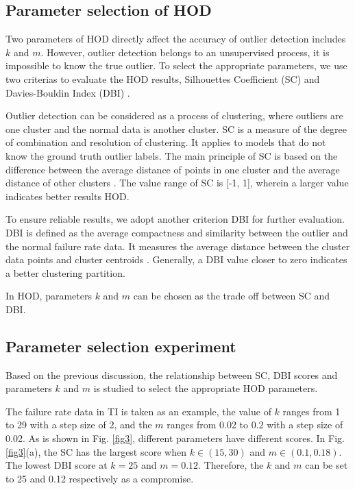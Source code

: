 \documentclass[journal,twoside,web]{ieeecolor}
\begin{document}
\subsection{Parameter selection of HOD}
Two parameters of HOD directly affect the accuracy of outlier detection includes $ k $ and $ m $. However, outlier detection belongs to an unsupervised process, it is impossible to know the true outlier. To select the appropriate parameters, we use two criterias to evaluate the HOD results, Silhouettes Coefficient (SC) and Davies-Bouldin Index (DBI) \cite{ROUSSEEUW198753}. 

Outlier detection can be considered as a process of clustering, where outliers are one cluster and the normal data is another cluster. SC is a measure of the degree of combination and resolution of clustering. It applies to models that do not know the ground truth outlier labels. The main principle of SC is based on the difference between the average distance of points in one cluster and the average distance of other clusters \cite{ROUSSEEUW198753}.  The value range of SC is [-1, 1], wherein a larger value indicates better results HOD.

To ensure reliable results, we adopt another criterion DBI for further evaluation. DBI is defined as the average compactness and similarity between the outlier and the normal failure rate data. It measures the average distance between the cluster data points and cluster centroids \cite{Halkidi}. Generally, a DBI value closer to zero indicates a better clustering partition.

In HOD, parameters $ k $ and $ m $ can be chosen as the trade off between SC and DBI.


\subsection{Parameter selection experiment}
Based on the previous discussion, the relationship between SC, DBI scores and parameters $ k $ and $ m $ is studied to select the appropriate HOD parameters.

The failure rate data in TI is taken as an example, the value of $ k $ ranges from 1 to 29 with a step size of 2, and the $ m $ ranges from 0.02 to 0.2 with a step size of 0.02. As is shown in Fig. \ref{fig3}, different parameters have different scores. In Fig. \ref{fig3}(a), the SC has the largest score when $ k \in (15, 30) $ and $ m \in (0.1, 0.18) $. The lowest DBI score at $ k=25 $ and $ m=0.12 $. Therefore, the  $ k $ and $ m $ can be set to 25 and 0.12 respectively as a compromise.
\end{document}

